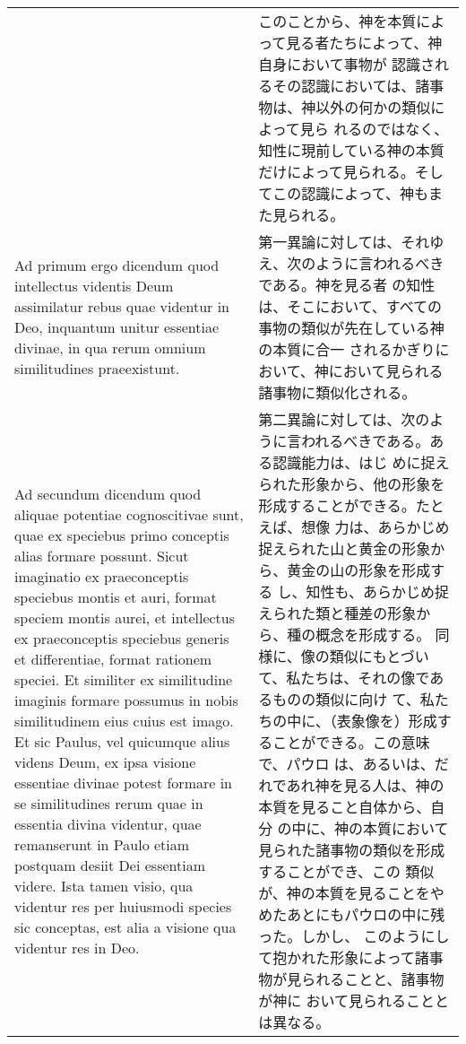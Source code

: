 \documentclass[10pt]{jsarticle} %
\begin{document}
\begin{longtable}{p{21em}p{21em}}
&

このことから、神を本質によって見る者たちによって、神自身において事物が
認識されるその認識においては、諸事物は、神以外の何かの類似によって見ら
れるのではなく、知性に現前している神の本質だけによって見られる。そし
てこの認識によって、神もまた見られる。

\\

{\sc  Ad primum ergo dicendum} quod intellectus videntis Deum
 assimilatur rebus quae videntur in Deo, inquantum unitur essentiae
 divinae, in qua rerum omnium similitudines praeexistunt.

&

第一異論に対しては、それゆえ、次のように言われるべきである。神を見る者
の知性は、そこにおいて、すべての事物の類似が先在している神の本質に合一
されるかぎりにおいて、神において見られる諸事物に類似化される。

\\

{\sc Ad secundum dicendum} quod aliquae potentiae cognoscitivae sunt,
quae ex speciebus primo conceptis alias formare possunt. Sicut
imaginatio ex praeconceptis speciebus montis et auri, format speciem
montis aurei, et intellectus ex praeconceptis speciebus generis et
differentiae, format rationem speciei. Et similiter ex similitudine
imaginis formare possumus in nobis similitudinem eius cuius est
imago. Et sic Paulus, vel quicumque alius videns Deum, ex ipsa visione
essentiae divinae potest formare in se similitudines rerum quae in
essentia divina videntur, quae remanserunt in Paulo etiam postquam
desiit Dei essentiam videre. Ista tamen visio, qua videntur res per
huiusmodi species sic conceptas, est alia a visione qua videntur res
in Deo.

&

第二異論に対しては、次のように言われるべきである。ある認識能力は、はじ
めに捉えられた形象から、他の形象を形成することができる。たとえば、想像
力は、あらかじめ捉えられた山と黄金の形象から、黄金の山の形象を形成する
し、知性も、あらかじめ捉えられた類と種差の形象から、種の概念を形成する。
同様に、像の類似にもとづいて、私たちは、それの像であるものの類似に向け
て、私たちの中に、（表象像を）形成することができる。この意味で、パウロ
は、あるいは、だれであれ神を見る人は、神の本質を見ること自体から、自分
の中に、神の本質において見られた諸事物の類似を形成することができ、この
類似が、神の本質を見ることをやめたあとにもパウロの中に残った。しかし、
このようにして抱かれた形象によって諸事物が見られることと、諸事物が神に
おいて見られることとは異なる。

\end{longtable}
\end{document}
